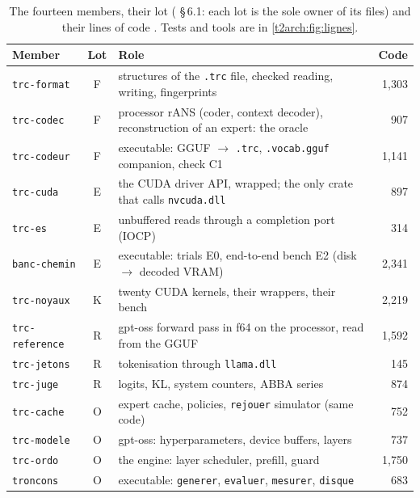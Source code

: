 \begin{table}[ht]
\centering\small
\begin{tabularx}{\linewidth}{l c >{\raggedright\arraybackslash}X r}
\toprule
Member & Lot & Role & Code \\
\midrule
\texttt{trc-format} & F & structures of the \texttt{.trc} file, checked reading, writing, fingerprints & 1{,}303 \\
\texttt{trc-codec} & F & processor rANS (coder, context decoder), reconstruction of an expert: the oracle & 907 \\
\texttt{trc-codeur} & F & executable: GGUF $\to$ \texttt{.trc}, \texttt{.vocab.gguf} companion, check C1 & 1{,}141 \\
\texttt{trc-cuda} & E & the CUDA driver API, wrapped; the only crate that calls \texttt{nvcuda.dll} & 897 \\
\texttt{trc-es} & E & unbuffered reads through a completion port (IOCP) & 314 \\
\texttt{banc-chemin} & E & executable: trials E0, end-to-end bench E2 (disk $\to$ decoded VRAM) & 2{,}341 \\
\texttt{trc-noyaux} & K & twenty CUDA kernels, their wrappers, their bench & 2{,}219 \\
\texttt{trc-reference} & R & gpt-oss forward pass in f64 on the processor, read from the GGUF & 1{,}592 \\
\texttt{trc-jetons} & R & tokenisation through \texttt{llama.dll} & 145 \\
\texttt{trc-juge} & R & logits, KL, system counters, ABBA series & 874 \\
\texttt{trc-cache} & O & expert cache, policies, \texttt{rejouer} simulator (same code) & 752 \\
\texttt{trc-modele} & O & gpt-oss: hyperparameters, device buffers, layers & 737 \\
\texttt{trc-ordo} & O & the engine: layer scheduler, prefill, guard & 1{,}750 \\
\texttt{troncons} & O & executable: \texttt{generer}, \texttt{evaluer}, \texttt{mesurer}, \texttt{disque} & 683 \\
\bottomrule
\end{tabularx}
\caption[The members of the workspace]{The fourteen members, their lot ( §\,6.1: each lot is the sole owner of its files) and their lines of code \calc. Tests and tools are in \cref{t2arch:fig:lignes}.}
\label{t2arch:tab:caisses}
\end{table}

